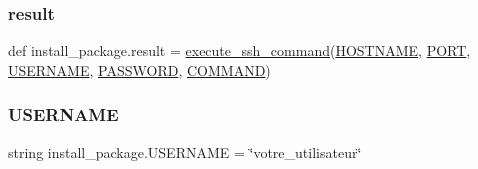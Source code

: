\mbox{\label{namespaceinstall__package_a50b9608065a7c7ad45282db7394d31d3}} 
\subsubsection{\texorpdfstring{result}{result}}
{\footnotesize\ttfamily def install\+\_\+package.\+result = \hyperlink{namespaceinstall__package_a42a6d7d8adb7f681d019e52307b723c8}{execute\+\_\+ssh\+\_\+command}(\hyperlink{namespaceinstall__package_a6cdc52ac805c6d2bee7e03a30dd65e08}{H\+O\+S\+T\+N\+A\+ME}, \hyperlink{namespaceinstall__package_a8fa4d0174c6c45253d8e8c21c1139e70}{P\+O\+RT}, \hyperlink{namespaceinstall__package_a943c3530ca14efbcf3f81a1df7b8c6e2}{U\+S\+E\+R\+N\+A\+ME}, \hyperlink{namespaceinstall__package_a3d33bc00d252344b0d3a00c4df7ea365}{P\+A\+S\+S\+W\+O\+RD}, \hyperlink{namespaceinstall__package_a4c23108a299350f164877e17265d5966}{C\+O\+M\+M\+A\+ND})}

\mbox{\label{namespaceinstall__package_a943c3530ca14efbcf3f81a1df7b8c6e2}} 
\subsubsection{\texorpdfstring{U\+S\+E\+R\+N\+A\+ME}{USERNAME}}
{\footnotesize\ttfamily string install\+\_\+package.\+U\+S\+E\+R\+N\+A\+ME = \char`\"{}votre\+\_\+utilisateur\char`\"{}}

